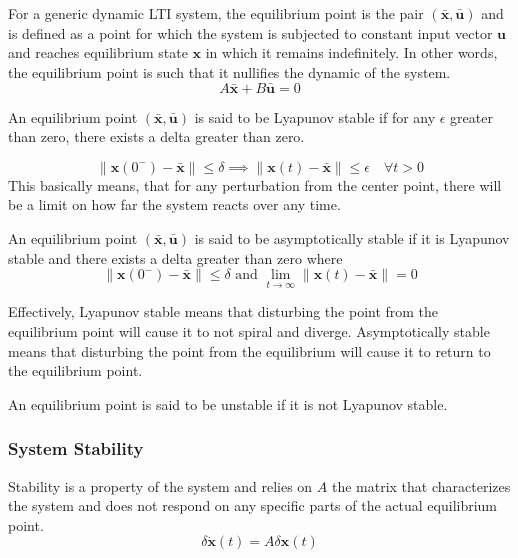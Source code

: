 \documentclass[11pt]{article}
\begin{document}
For a generic dynamic LTI system, the equilibrium point is the pair $(\bar{\textbf{x}}, \bar{\textbf{u}})$
and is defined as a point for which the system is subjected to constant input vector $\textbf{u}$ and reaches equilibrium state $\textbf{x}$ in which it remains indefinitely.
In other words, the equilibrium point is such that it nullifies the dynamic of the system.
\begin{equation}
  A \bar{\textbf{x}} + B \bar{\textbf{u}} = 0
\end{equation}

An equilibrium point  $(\bar{\textbf{x}}, \bar{\textbf{u}})$ is said to be Lyapunov stable if for any $\epsilon$ greater than zero, there exists a delta greater than zero.

\begin{equation}
  \| \textbf{x}(0^-) - \bar{\textbf{x}} \| \leq \delta \implies \| \textbf{x}(t) - \bar{\textbf{x}} \| \leq \epsilon \quad \forall t > 0
\end{equation}
This basically means, that for any perturbation from the center point, there will be a limit on how far the system reacts over any time.

An equilibrium point  $(\bar{\textbf{x}}, \bar{\textbf{u}})$ is said to be asymptotically stable if it is Lyapunov stable and there exists a delta greater than zero where
\begin{equation}
  \| \textbf{x}(0^-) - \bar{\textbf{x}} \| \leq \delta \text{ and } \lim_{t \to \infty} \| \textbf{x}(t) - \bar{\textbf{x}} \| = 0
\end{equation} 

Effectively, Lyapunov stable means that disturbing the point from the equilibrium point will cause it to not spiral and diverge.
Asymptotically stable means that disturbing the point from the equilibrium will cause it to return to the equilibrium point.

An equilibrium point is said to be unstable if it is not Lyapunov stable.

\subsubsection{System Stability}
Stability is a property of the system and relies on $A$ the matrix that characterizes the system and does not respond on any specific parts of the actual equilibrium point.
\begin{equation}
  \delta \dot{\textbf{x}} (t) = A \delta \textbf{x}(t)
\end{equation}
\end{document}
